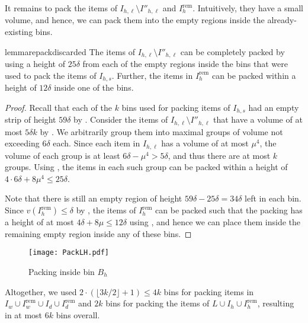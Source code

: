 \documentclass[a4paper,UKenglish,cleveref, autoref, thm-restate]{lipics-v2021}
\begin{document}
It remains to pack the items of $I_{h,\ell}\setminus I''_{h,\ell}$ and $I^{\text{rem}}_h$. Intuitively, they have a small volume, and hence, we can pack them into the empty regions inside the already-existing bins.

\begin{restatable}{lemma}{repackdiscarded}
\label{lem:repackdiscarded}
    The items of $I_{h,\ell}\setminus I''_{h,\ell}$ can be completely packed by using a height of $25\delta$ from each of the empty regions inside the bins that were used to pack the items of $I_{h,s}$. Further, the items in $I^{\text{rem}}_h$ can be packed within a height of $12\delta$ inside one of the bins.
\end{restatable}
\begin{proof}
    Recall that each of the $k$ bins used for packing items of $I_{h,s}$ had an empty strip of height $59\delta$ by . Consider the items of $I_{h,\ell}\setminus I''_{h,\ell}$ that have a volume of at most $5\delta k$ by . We arbitrarily group them into maximal groups of volume not exceeding $6\delta$ each. Since each item in $I_{h,\ell}$ has a volume of at most $\mu^4$, the volume of each group is at least $6\delta - \mu^4 > 5\delta$, and thus there are at most $k$ groups. Using , the items in each such group can be packed within a height of $4\cdot 6\delta + 8\mu^4 \le 25\delta$.

    Note that there is still an empty region of height $59\delta - 25\delta = 34\delta$ left in each bin. 
    Since $v(I^{\text{rem}}_h)\le \delta$ by , the items of $I^{\text{rem}}_h$ can be packed such that the packing has a height of at most $4\delta + 8\mu \le 12\delta$ using , and hence we can place them inside the remaining empty region inside any of these bins.
\end{proof}

\begin{figure}
    \centering
    \texttt{[image: PackLH.pdf]}
    \caption{Packing inside bin $B_h$}
    \label{fig:Planes cutting}
\end{figure}



Altogether, we used $2\cdot (\lfloor 3k/2\rfloor +1)\le 4k$ bins for packing items in $I_w \cup I^{\text{rem}}_w \cup I_d \cup I^{\text{rem}}_d$ and $2k$ bins for packing the items of $L\cup I_h \cup I^{\text{rem}}_h$, resulting in at most $6k$ bins overall.
\end{document}
